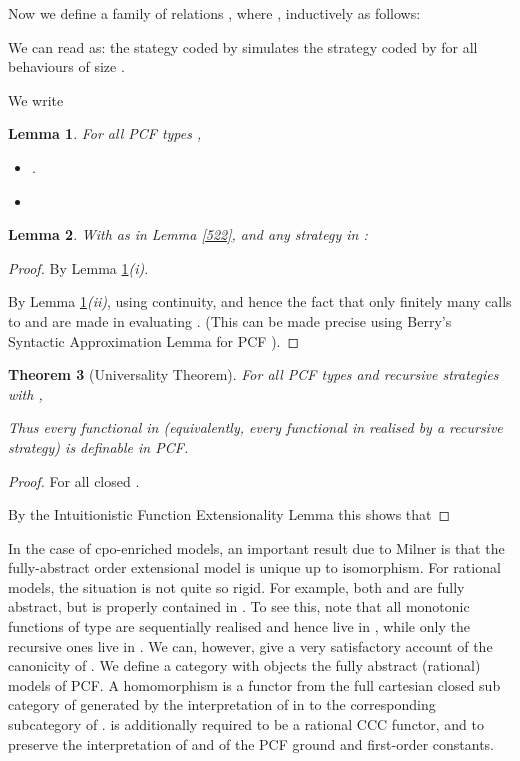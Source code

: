 \documentclass[11pt]{article}
\newtheorem{theorem}{Theorem}[section]
\newtheorem{lemma}[theorem]{Lemma}
\begin{document}
Now we define a family of relations , where
, inductively as follows:


We can read  as: the stategy coded by  simulates the
strategy coded by  for all behaviours of size .

We write 

\begin{lemma}\label{due}
For all PCF types , 
\begin{itemize}
\item[(i)] .
\item[(ii)] 
\end{itemize}
\end{lemma}

\begin{lemma}\label{tre}
With  as in Lemma \ref{522}, and  any strategy
in :

\end{lemma}

\begin{proof}  By Lemma \ref{due}{\it (i)}.

 By Lemma \ref{due}{\it (ii)}, using continuity,
and hence the fact that only finitely many calls to  and 
are made in evaluating .
(This can be made precise using Berry's Syntactic Approximation
Lemma for PCF \cite{BerryG:fulasl}).
\end{proof}



\begin{theorem}[Universality Theorem]
For all PCF types  and recursive strategies  with
,

Thus every functional in  (equivalently, every functional
in  realised by a recursive strategy) is definable in PCF.
\end{theorem}

\begin{proof} For all closed .


\noindent By the Intuitionistic Function Extensionality Lemma this
shows that 
\end{proof}


In the case of cpo-enriched models, an important result due to Milner
is that the fully-abstract order extensional model is unique up to isomorphism.
For rational models, the situation is not quite so rigid. For example, both
 and  are fully abstract, but  is
properly contained in . To see this, note that all monotonic functions
of type  are sequentially realised and hence live in
, while only the recursive ones live in .
We can, however, give a very satisfactory account of the canonicity of
. We define a category  with objects
the fully abstract (rational) models of PCF.
A homomorphism  is a functor
from the full cartesian closed sub category of  generated by
the interpretation
of  in  to the corresponding subcategory of .
 is additionally required to be a rational CCC functor, and to preserve the
interpretation of  and of the PCF ground and first-order constants.
\end{document}
